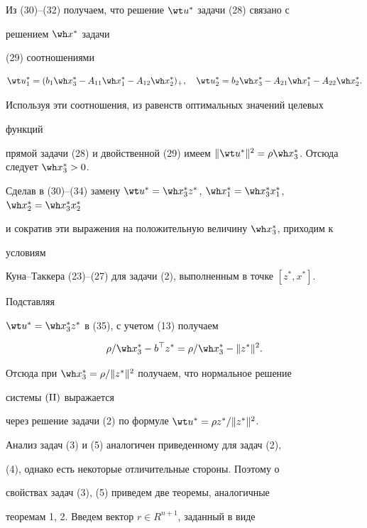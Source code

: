 \begin{pf}
Из (30)--(32) получаем, что решение $\wt u^*$ задачи (28) связано с 


решением $\wh x^*$ задачи


(29) соотношениями


$$


\wt u^*_1=(b_1\wh x^*_3-A_{11}\wh x^*_1-A_{12}\wh x^*_2)_+,\quad


\wt u^*_2=b_2\wh x^*_3-A_{21}\wh x^*_1-A_{22}\wh x^*_2.


$$


Используя эти соотношения, из равенств оптимальных значений целевых 


функций


прямой задачи (28) и двойственной (29) имеем $\|\wt u^*\|^2=\rho\wh 


x^*_3$. Отсюда следует $\wh x^*_3>0$.





Сделав в (30)--(34) замену $\wt u^*=\wh x^*_3z^*$, $\wh x^*_1=\wh 


x^*_3x^*_1$, $\wh x^*_2=\wh x^*_3x^*_2$


и сократив эти выражения на положительную величину $\wh x^*_3$, приходим к 


условиям


Куна--Таккера (23)--(27) для задачи (2), выполненным в точке $[z^*,x^*]$. 


Подставляя


$\wt u^*=\wh x^*_3z^*$ в (35), с учетом (13) получаем


$$


\rho/\wh x^*_3-b^\top z^*=\rho/\wh x^*_3-\|z^*\|^2.


$$


Отсюда при $\wh x^*_3=\rho/\|z^*\|^2$ получаем, что нормальное решение 


системы $(\mathrm{II})$ выражается


через решение задачи (2) по формуле $\wt u^*=\rho z^*/\|z^*\|^2$.


\end{pf}





Анализ задач (3) и (5) аналогичен приведенному для задач (2),


(4), однако есть некоторые отличительные стороны. Поэтому о


свойствах задач (3), (5) приведем две теоремы, аналогичные


теоремам 1, 2. Введем вектор $r\in R^{n+1}$, заданный в виде 


